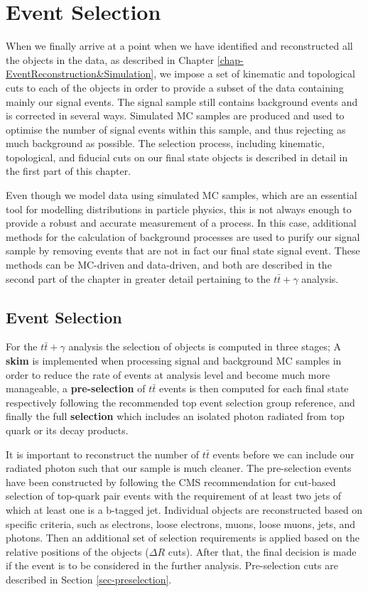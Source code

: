 \chapter{Event Selection} \label{chap-EventSelection}

When we finally arrive at a point when we have identified and reconstructed all the objects in the data, as described in Chapter \ref{chap-EventReconstruction&Simulation}, we impose a set of kinematic and topological cuts to each of the objects in order to provide a subset of the data containing mainly our signal events. The signal sample still contains background events and is corrected in several ways. Simulated MC samples are produced and used to optimise the number of signal events within this sample, and thus rejecting as much background as possible. The selection process, including kinematic, topological, and fiducial cuts on our final state objects is described in detail in the first part of this chapter.

Even though we model data using simulated MC samples, which are an essential tool for modelling distributions in particle physics, this is not always enough to provide a robust and accurate measurement of a process. In this case, additional methods for the calculation of background processes are used to purify our signal sample by removing events that are not in fact our final state signal event. These methods can be MC-driven and data-driven, and both are described in the second part of the chapter in greater detail pertaining to the $t\bar{t}+\gamma$ analysis.  

\section{Event Selection} \label{sec-EventSelection}

For the $t\bar{t}+\gamma$ analysis the selection of objects is computed in three stages; A \textbf{skim} is implemented when processing signal and background MC samples in order to reduce the rate of events at analysis level and become much more manageable, a \textbf{pre-selection} of $t\bar{t}$ events is then computed for each final state respectively following the recommended top event selection group reference, and finally the full \textbf{selection} which includes an isolated photon radiated from top quark or its decay products.   

It is important to reconstruct the number of $t\bar{t}$ events before we can include our radiated photon such that our sample is much cleaner. 
The pre-selection events have been constructed by following the CMS recommendation for cut-based selection of top-quark pair events with the requirement of at least two jets of which at least one is a b-tagged jet. Individual objects are reconstructed based on specific criteria, such as electrons, loose electrons, muons, loose muons, jets, and photons. Then an additional set of selection requirements is applied based on the relative positions of the objects ($\Delta R$ cuts). After that, the final decision is made if the event is to be considered in the further analysis. Pre-selection cuts are described in Section \ref{sec-preselection}.

